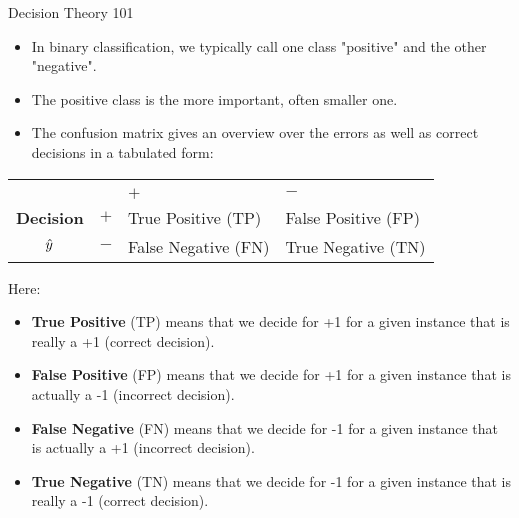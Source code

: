 \documentclass[11pt,compress,t,notes=noshow, xcolor=table]{beamer}
\begin{document}
\begin{vbframe}{Decision Theory 101}
	\scriptsize{
		\begin{itemize}
%			
			\item In binary classification, we typically call one class "positive" and the 
			other "negative".
%			
			\item The positive class is the more important, often smaller one.
%			
			\item The confusion matrix gives an overview over the errors as well as correct decisions in a tabulated form:
%
		\end{itemize}
		
		\begin{center}
			\footnotesize
			\begin{tabular}{cc|>{\centering\arraybackslash}p{7em}>{\centering\arraybackslash}p{8em}}
				& & \multicolumn{2}{c}{\bfseries True Class $y$} \\
				& & $+$ & $-$ \\
				\hline
				\bfseries Decision     & $+$ & True Positive (TP)  & False Positive (FP) \\
				$\hat{y}$ & $-$ & False Negative (FN) & True Negative (TN) \\
			\end{tabular}
		\end{center}
		Here:
		\begin{itemize}
			\item \textbf{True Positive} (TP) means that we decide for +1 for a given instance 
			that is really a +1 (correct decision).
			 \item \textbf{False Positive} (FP) means that we decide for +1 for a given instance 
			 that is actually a -1 (incorrect decision). 
			\item \textbf{False Negative} (FN) means that we decide for -1 for a given instance 
			that is actually a +1 (incorrect decision). 
			 \item \textbf{True Negative} (TN) means that we decide for -1 for a given instance 
			 that is really a -1 (correct decision).
		\end{itemize}
		
	}
\end{vbframe}
\end{document}

